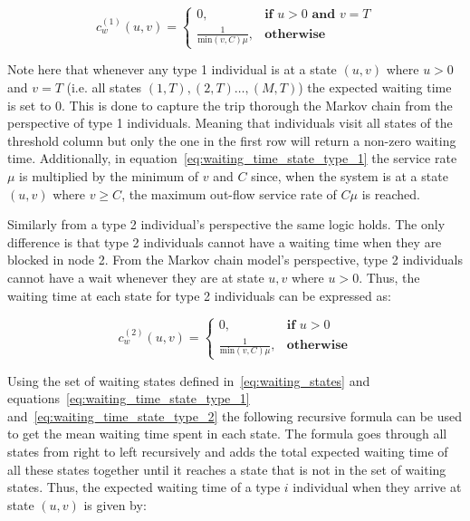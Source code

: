 \begin{equation}\label{eq:waiting_time_state_type_1}
    c^{(1)}_w(u,v) =
    \begin{cases}
        0, & \textbf{if } u > 0 \textbf{ and } v = T \\
        \frac{1}{\text{min}(v,C)\mu}, & \textbf{otherwise}
    \end{cases}
\end{equation}

Note here that whenever any type 1 individual is at a state \((u,v)\) where
\(u > 0\) and \(v = T\) (i.e. all states \((1,T), (2,T) \dots, (M,T)\)) the
expected waiting time is set to \(0\).
This is done to capture the trip thorough the Markov chain from the perspective
of type 1 individuals.
Meaning that individuals visit all states of the threshold column but only the
one in the first row will return a non-zero waiting time.
Additionally, in equation~\eqref{eq:waiting_time_state_type_1} the service rate
\(\mu\) is multiplied by the minimum of \(v\) and \(C\) since, when the system
is at a state \((u,v)\) where \(v \geq C\), the maximum out-flow service rate
of \( C \mu \) is reached.


Similarly from a type 2 individual's perspective the same logic holds.
The only difference is that type 2 individuals cannot have a waiting time when
they are blocked in node 2.
From the Markov chain model's perspective, type 2 individuals cannot have a wait
whenever they are at state \(u, v\) where \(u > 0\).
Thus, the waiting time at each state for type 2 individuals can be expressed as:

\begin{equation}\label{eq:waiting_time_state_type_2}
    c^{(2)}_w(u,v) =
    \begin{cases}
        0, & \textbf{if } u > 0 \\
        \frac{1}{\text{min}(v, C)\mu}, & \textbf{otherwise}
    \end{cases}
\end{equation}


Using the set of waiting states defined in~\eqref{eq:waiting_states} and
equations~\eqref{eq:waiting_time_state_type_1}
and~\eqref{eq:waiting_time_state_type_2} the following recursive formula can be
used to get the mean waiting time spent in each state.
The formula goes through all states from right to left recursively and adds the
total expected waiting time of all these states together until it reaches a
state that is not in the set of waiting states.
Thus, the expected waiting time of a type \(i\) individual when they arrive at
state \( (u,v) \) is given by:

